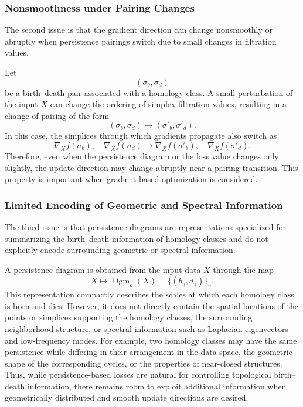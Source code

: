 \documentclass[pdflatex,sn-mathphys-num]{sn-jnl}%
\theoremstyle{thmstyleone}%
\theoremstyle{thmstyletwo}%
\theoremstyle{thmstylethree}%
\begin{document}
\subsubsection{Nonsmoothness under Pairing Changes}

The second issue is that the gradient direction can change nonsmoothly or abruptly when persistence pairings switch due to small changes in filtration values.

Let
\[
(\sigma_b,\sigma_d)
\]
be a birth--death pair associated with a homology class.
A small perturbation of the input \(X\) can change the ordering of simplex filtration values, resulting in a change of pairing of the form
\[
(\sigma_b,\sigma_d)
\longrightarrow
(\sigma'_b,\sigma'_d).
\]
In this case, the simplices through which gradients propagate also switch as
\[
\nabla_Xf(\sigma_b),
\quad
\nabla_Xf(\sigma_d)
\longrightarrow
\nabla_Xf(\sigma'_b),
\quad
\nabla_Xf(\sigma'_d).
\]
Therefore, even when the persistence diagram or the loss value changes only slightly, the update direction may change abruptly near a pairing transition.
This property is important when gradient-based optimization is considered.

\subsubsection{Limited Encoding of Geometric and Spectral Information}

The third issue is that persistence diagrams are representations specialized for summarizing the birth--death information of homology classes and do not explicitly encode surrounding geometric or spectral information.

A persistence diagram is obtained from the input data \(X\) through the map
\[
X
\longmapsto
\operatorname{Dgm}_k(X)
=
\{(b_\gamma,d_\gamma)\}_{\gamma}.
\]
This representation compactly describes the scales at which each homology class is born and dies.
However, it does not directly contain the spatial locations of the points or simplices supporting the homology classes, the surrounding neighborhood structure, or spectral information such as Laplacian eigenvectors and low-frequency modes.
For example, two homology classes may have the same persistence while differing in their arrangement in the data space, the geometric shape of the corresponding cycles, or the properties of near-closed structures.
Thus, while persistence-based losses are natural for controlling topological birth--death information, there remains room to exploit additional information when geometrically distributed and smooth update directions are desired.
\end{document}

